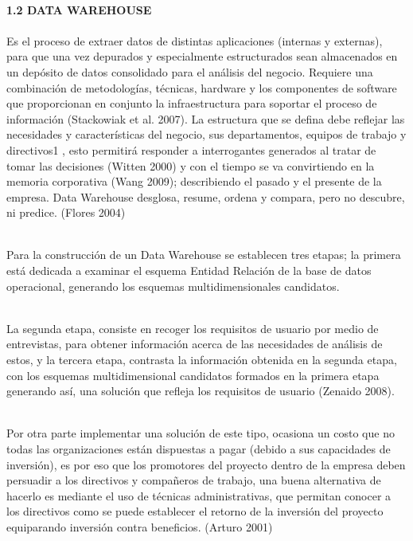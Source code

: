 \begin{flushleft}
\textbf{}\\
\textbf{}\\
\textbf{}\\
\textbf{}\\
\textbf{}\\
\textbf{}\\
\textbf {1.2 DATA WAREHOUSE}\\
\textbf{}\\
Es el proceso de extraer datos de distintas aplicaciones (internas y externas), para que una vez depurados y especialmente estructurados sean almacenados en un depósito de datos consolidado para el análisis del negocio. Requiere una combinación de metodologías, técnicas, hardware y los componentes de software que proporcionan en conjunto la infraestructura para soportar el proceso de información (Stackowiak et al. 2007). La estructura que se defina debe reflejar las necesidades y características del negocio, sus departamentos, equipos de trabajo y directivos1 , esto permitirá responder a interrogantes generados al tratar de tomar las decisiones (Witten 2000) y con el tiempo se va convirtiendo en la memoria corporativa (Wang 2009); describiendo el pasado y el presente de la empresa. Data Warehouse desglosa, resume, ordena y compara, pero no descubre, ni predice. (Flores 2004) 

\textbf{}\\
Para la construcción de un Data Warehouse se establecen tres etapas; la primera está dedicada a examinar el esquema Entidad Relación de la base de datos operacional, generando los esquemas multidimensionales candidatos. 

\textbf{}\\
La segunda etapa, consiste en recoger los requisitos de usuario por medio de entrevistas, para obtener información acerca de las necesidades de análisis de estos, y la tercera etapa, contrasta la información obtenida en la segunda etapa, con los esquemas multidimensional candidatos formados en la primera etapa generando así, una solución que refleja los requisitos de usuario (Zenaido 2008). 

\textbf{}\\
Por otra parte implementar una solución de este tipo, ocasiona un costo que no todas las organizaciones están dispuestas a pagar (debido a sus capacidades de inversión), es por eso que los promotores del proyecto dentro de la empresa deben persuadir a los directivos y compañeros de trabajo, una buena alternativa de hacerlo es mediante el uso de técnicas administrativas, que permitan conocer a los directivos como se puede establecer el retorno de la inversión del proyecto equiparando inversión contra beneficios. (Arturo 2001)


\end{flushleft}
